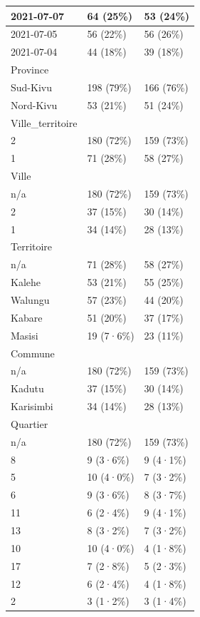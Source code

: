 \documentclass[
]{book}
\begin{document}
\begin{tabular}{l|l|l}
\hline
2021-07-07 & 64 (25\%) & 53 (24\%)\\
\hline
2021-07-05 & 56 (22\%) & 56 (26\%)\\
\hline
2021-07-04 & 44 (18\%) & 39 (18\%)\\
\hline
Province &  & \\
\hline
Sud-Kivu & 198 (79\%) & 166 (76\%)\\
\hline
Nord-Kivu & 53 (21\%) & 51 (24\%)\\
\hline
Ville\_territoire &  & \\
\hline
2 & 180 (72\%) & 159 (73\%)\\
\hline
1 & 71 (28\%) & 58 (27\%)\\
\hline
Ville &  & \\
\hline
n/a & 180 (72\%) & 159 (73\%)\\
\hline
2 & 37 (15\%) & 30 (14\%)\\
\hline
1 & 34 (14\%) & 28 (13\%)\\
\hline
Territoire &  & \\
\hline
n/a & 71 (28\%) & 58 (27\%)\\
\hline
Kalehe & 53 (21\%) & 55 (25\%)\\
\hline
Walungu & 57 (23\%) & 44 (20\%)\\
\hline
Kabare & 51 (20\%) & 37 (17\%)\\
\hline
Masisi & 19 (7·6\%) & 23 (11\%)\\
\hline
Commune &  & \\
\hline
n/a & 180 (72\%) & 159 (73\%)\\
\hline
Kadutu & 37 (15\%) & 30 (14\%)\\
\hline
Karisimbi & 34 (14\%) & 28 (13\%)\\
\hline
Quartier &  & \\
\hline
n/a & 180 (72\%) & 159 (73\%)\\
\hline
8 & 9 (3·6\%) & 9 (4·1\%)\\
\hline
5 & 10 (4·0\%) & 7 (3·2\%)\\
\hline
6 & 9 (3·6\%) & 8 (3·7\%)\\
\hline
11 & 6 (2·4\%) & 9 (4·1\%)\\
\hline
13 & 8 (3·2\%) & 7 (3·2\%)\\
\hline
10 & 10 (4·0\%) & 4 (1·8\%)\\
\hline
17 & 7 (2·8\%) & 5 (2·3\%)\\
\hline
12 & 6 (2·4\%) & 4 (1·8\%)\\
\hline
2 & 3 (1·2\%) & 3 (1·4\%)\\
\hline

\end{tabular}
\end{document}
